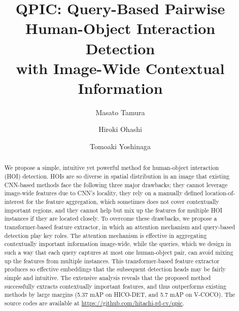 \documentclass[final]{cvpr}
\begin{document}
\title{QPIC: Query-Based Pairwise Human-Object Interaction Detection \\with Image-Wide Contextual Information\vspace{-3ex}}

\author[1]{Masato Tamura}
\author[2]{Hiroki Ohashi}
\author[1]{Tomoaki Yoshinaga}


\maketitle

\begin{abstract}
We propose a simple, intuitive yet powerful method for human-object interaction (HOI) detection. 
HOIs are so diverse in spatial distribution in an image that existing CNN-based methods face the following three major drawbacks;
 they cannot leverage image-wide features due to CNN's locality,
 they rely on a manually defined location-of-interest for the feature aggregation, which sometimes does not cover contextually important regions,
 and they cannot help but mix up the features for multiple HOI instances if they are located closely.
To overcome these drawbacks, we propose a transformer-based feature extractor, in which an attention mechanism and query-based detection play key roles. 
The attention mechanism is effective in aggregating contextually important information image-wide, while the queries, which we design in such a way that each query captures at most one human-object pair, can avoid mixing up the features from multiple instances.
This transformer-based feature extractor produces so effective embeddings that the subsequent detection heads may be fairly simple and intuitive.
The extensive analysis reveals that the proposed method successfully extracts contextually important features, and thus outperforms existing methods by large margins (5.37 mAP on HICO-DET, and 5.7 mAP on V-COCO). The source codes
are available at \url{https://github.com/hitachi-rd-cv/qpic}.
\end{abstract}

\vspace{-2ex}
\end{document}
